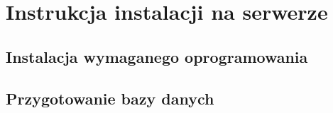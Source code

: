 \documentclass[a4paper, titlepage]{article}
\begin{document}
				\section{Instrukcja instalacji na serwerze}    
				\subsection{Instalacja wymaganego oprogramowania}
			\subsection{Przygotowanie bazy danych}

			
\end{document}
